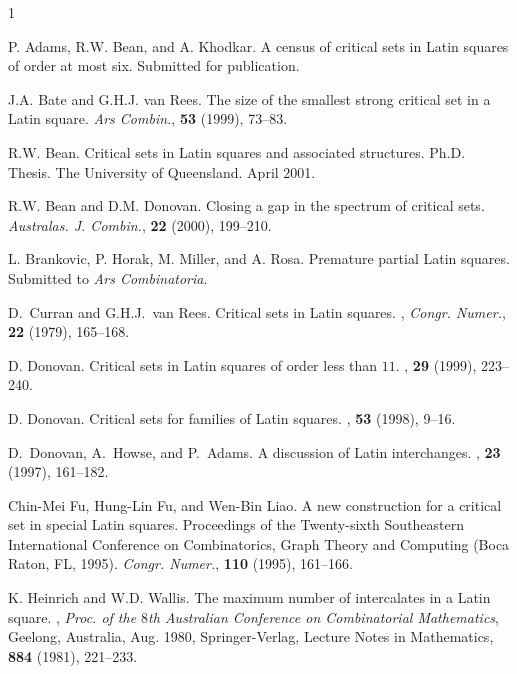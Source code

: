 \documentclass[12pt]{article}
\begin{document}
\begin{thebibliography}{1}

{\sc P. Adams, R.W. Bean, and A. Khodkar}.
A census of critical sets in Latin squares of order at most six.
Submitted for publication.

{\sc J.A. Bate and G.H.J. van Rees}.
The size of the smallest strong
  critical set in a Latin square.
{\em  Ars Combin.}, {\bf 53} (1999), 73--83.

{\sc R.W. Bean}. Critical sets in Latin squares and associated structures. 
Ph.D. Thesis. The University of Queensland. April 2001.

{\sc R.W. Bean and D.M. Donovan}.
Closing a gap in the spectrum of critical sets.
{\em Australas. J. Combin.}, {\bf 22} (2000), 199--210.

{\sc L. Brankovic, P. Horak, M. Miller, and A. Rosa}.
\newblock Premature partial Latin squares.
\newblock  Submitted to {\em Ars Combinatoria}.


{\sc D.~Curran and G.H.J.~van Rees}.
\newblock Critical sets in Latin squares.
, {\em Congr. Numer.}, {\bf 22} (1979), 165--168.

{\sc D. Donovan}.
\newblock Critical sets in Latin squares of order less than $11$.
, {\bf 29} (1999), 223--240.

{\sc D. Donovan}.
\newblock Critical sets for families of {L}atin squares.
, {\bf 53} (1998), 9--16.

{\sc D.\ Donovan, A.\ Howse, and P.\ Adams}.
\newblock A discussion of Latin interchanges.
,
{\bf 23} (1997), 161--182.

{\sc  Chin-Mei Fu, Hung-Lin Fu, and  Wen-Bin Liao}.
A new construction for a critical set in special Latin squares.
Proceedings of the Twenty-sixth Southeastern International Conference
on Combinatorics, Graph Theory and Computing (Boca Raton, FL, 1995).
{\em Congr. Numer.}, {\bf 110} (1995), 161--166.


{\sc K. Heinrich and W.D. Wallis}.
   The maximum number of intercalates in a Latin square.
,
{\it Proc. of the $8$th Australian Conference on Combinatorial Mathematics},
Geelong, Australia, Aug. 1980, Springer-Verlag,
Lecture Notes in Mathematics, {\bf 884} (1981), 221--233.


\end{thebibliography}
\end{document}

